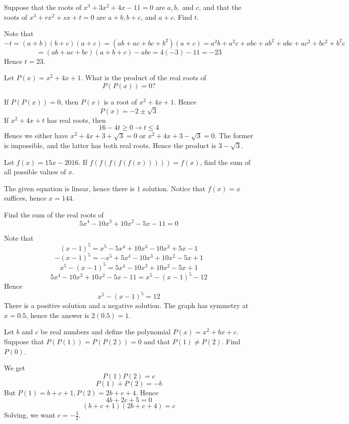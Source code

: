 \documentclass[11pt]{scrartcl}
\begin{document}
\begin{example}
  [AIME 1996]
  Suppose that the roots of $x^3+3x^2+4x-11=0$ are $a,b,$ and $c$, and that
  the roots of $x^3+rx^2+sx+t=0$ are $a+b, b+c$, and $a+c$. Find $t$.
\end{example}
\begin{soln}
  Note that
  $$-t=(a+b)(b+c)(a+c)=(ab+ac+bc+b^2)(a+c)=a^2b+a^2c+abc+ab^2+abc+ac^2+bc^2+b^2c$$
  $$=(ab+ac+bc)(a+b+c)-abc=4(-3)-11=-23$$
  Hence $t=23$.
\end{soln}
\begin{example}
  [CMIMC 2018]
  Let $P(x)=x^2+4x+1$. What is the product of the real roots of
  $$P(P(x))=0?$$
\end{example}
\begin{soln}
  If $P(P(x))=0$, then $P(x)$ is a root of $x^2+4x+1$. Hence
  $$P(x)=-2\pm \sqrt{3}$$
  If $x^2+4x+t$ has real roots, then
  $$16-4t\ge 0\to t\le 4$$
  Hence we either have $x^2+4x+3+\sqrt{3}=0$ or $x^2+4x+3-\sqrt{3}=0$.
  The former is impossible, and the latter has both real roots.
  Hence the product is $3-\sqrt{3}$.
\end{soln}
\begin{example}
  [PuMAC 2016]
  Let $f(x)=15x-2016$. If $f(f(f(f(f(x)))))=f(x)$, find the sum of all
  possible values of $x$.
\end{example}
\begin{soln}
  The given equation is linear, hence there is $1$ solution.
  Notice that $f(x)=x$ suffices, hence $x=144$.
\end{soln}
\begin{example}
  [HMMT 2014]
  Find the sum of the real roots of
  $$5x^4-10x^3+10x^2-5x-11=0$$
\end{example}
\begin{soln}
  Note that
  $$(x-1)^5=x^5-5x^4+10x^3-10x^2+5x-1$$
  $$-(x-1)^5=-x^5+5x^4-10x^3+10x^2-5x+1$$
  $$x^5-(x-1)^5=5x^4-10x^3+10x^2-5x+1$$
  $$5x^4-10x^3+10x^2-5x-11=x^5-(x-1)^5-12$$
  Hence
  $$x^5-(x-1)^5=12$$
  There is a positive solution and a negative solution.
  The graph has symmetry at $x=0.5$, hence the answer is $2(0.5)=1$.
\end{soln}
\begin{example}
  [HMMT 2014]
  Let $b$ and $c$ be real numbers and define the polynomial
  $P(x)=x^2+bx+c$. Suppose that $P(P(1))=P(P(2))=0$ and that $P(1)\ne P(2)$.
  Find $P(0)$.
\end{example}
\begin{soln}
  We get
  $$P(1)P(2)=c$$
  $$P(1)+P(2)=-b$$
  But $P(1)=b+c+1, P(2)=2b+c+4$. Hence
  $$4b+2c+5=0$$
  $$(b+c+1)(2b+c+4)=c$$
  Solving, we want $c=-\frac{3}{2}$.
\end{soln}
\end{document}
